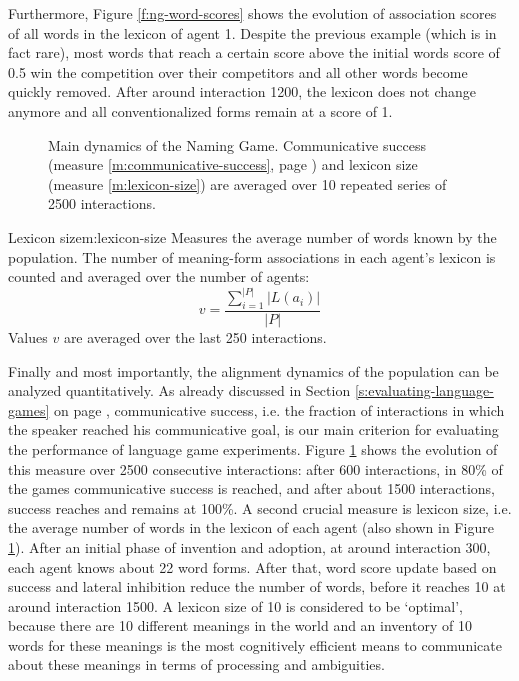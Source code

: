Furthermore, Figure \ref{f:ng-word-scores} shows the evolution of
association scores of all words in the lexicon of agent 1. Despite the
previous example (which is in fact rare), most words that reach a
certain score above the initial words score of 0.5 win the competition
over their competitors and all other words become quickly
removed. After around interaction 1200, the lexicon does not change
anymore and all conventionalized forms remain at a score of 1.\\


\begin{figure}[t]
  \caption{Main dynamics of the Naming Game. Communicative success
    (measure \ref{m:communicative-success}, page
    \pageref{m:communicative-success}) and lexicon size (measure
    \ref{m:lexicon-size}) are averaged over 10 repeated series of 2500
    interactions.}
  \label{f:ng-success+lexicon-size}
\end{figure}

\begin{measure}[b]{Lexicon size}{m:lexicon-size}
  Measures the average number of words known by the population. The
  number of meaning-form associations in each agent's lexicon is
  counted and averaged over the number of agents:
  $$v = \frac{\sum_{i=1}^{|P|} |L(a_i)|}{|P|}$$
  Values $v$ are averaged over the last 250 interactions.
\end{measure}

Finally and most importantly, the alignment dynamics of the population
can be analyzed quantitatively. As already discussed in Section
\ref{s:evaluating-language-games} on page
\pageref{s:evaluating-language-games}, communicative success, i.e. the
fraction of interactions in which the speaker reached his
communicative goal, is our main criterion for evaluating the
performance of language game experiments. Figure
\ref{f:ng-success+lexicon-size} shows the evolution of this measure
over 2500 consecutive interactions: after 600 interactions, in 80\% of
the games communicative success is reached, and after about 1500
interactions, success reaches and remains at 100\%. A second crucial
measure is lexicon size, i.e. the average number of words in the
lexicon of each agent (also shown in Figure
\ref{f:ng-success+lexicon-size}). After an initial phase of invention
and adoption, at around interaction 300, each agent knows about 22
word forms. After that, word score update based on success and lateral
inhibition reduce the number of words, before it reaches 10 at around
interaction 1500. A lexicon size of 10 is considered to be `optimal',
because there are 10 different meanings in the world and an inventory
of 10 words for these meanings is the most cognitively efficient means
to communicate about these meanings in terms of processing and
ambiguities.


